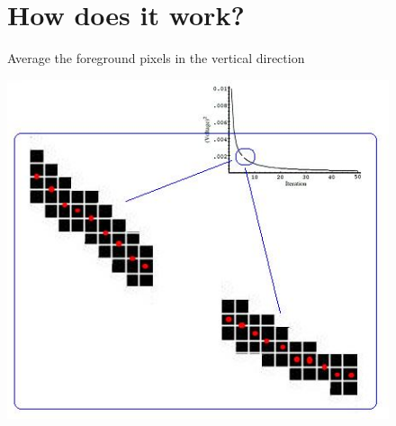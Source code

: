 \documentclass[12pt]{article}
\begin{document}
\begin{figure}[ht]
\end{figure}

\begin{figure}
\section{How does it work?}
  Average the foreground pixels in the vertical direction

  \centering \includegraphics{./tut_files/16_how_does_it_work.jpg}
\end{figure}
\end{document}
